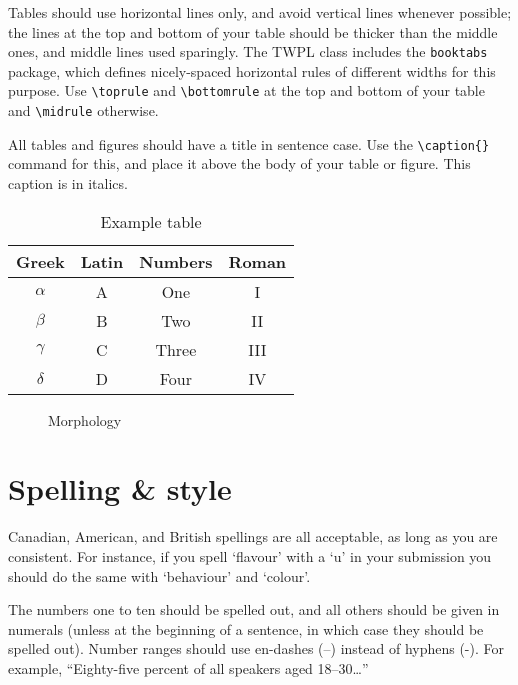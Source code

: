 \documentclass[xelatex,linguex]{TWPL}
\begin{document}
Tables should use horizontal lines only, and avoid vertical lines whenever possible; the lines at the top and bottom of your table should be thicker than the middle ones, and middle lines used sparingly. The TWPL class includes the \texttt{booktabs} package, which defines nicely-spaced horizontal rules of different widths for this purpose. Use \verb;\toprule; and \verb;\bottomrule; at the top and bottom of your table and \verb;\midrule; otherwise.

All tables and figures should have a title in sentence case. Use the \verb;\caption{}; command for this, and place it above the body of your table or figure. This caption is in italics.

\begin{table}[h]
	\caption{Example table}
	\label{tab:}
	\centering
	\begin{tabular}{cccc}
	\toprule
Greek & Latin & Numbers & Roman \\
\midrule
$\alpha$	& A	& 	One 	& I \\
$\beta$		& B	&	Two 	& II \\
$\gamma$	& C	&	Three 	& III  \\
$\delta$	& D	&	Four 	& IV  \\
\bottomrule
\end{tabular}
\end{table}

\begin{figure}[h]
	\centering
	\caption{Morphology}
	\label{fig:}
\end{figure}


\section{Spelling \& style}

Canadian, American, and British spellings are all acceptable, as long as you are consistent. For instance, if you spell `flavour' with a `u' in your submission you should do the same with `behaviour' and `colour'. 

The numbers one to ten should be spelled out, and all others should be given in numerals (unless at the beginning of a sentence, in which case they should be spelled out). Number ranges should use en-dashes (--) instead of hyphens (-). For example, ``Eighty-five percent of all speakers aged 18--30\ldots'' 
\end{document}
